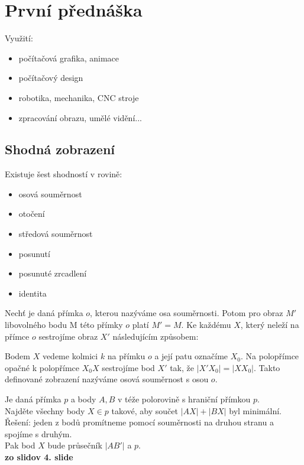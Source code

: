 \documentclass[../main.tex]{subfiles}
\begin{document}
\section{První přednáška}

Využití:
\begin{itemize}
    \item počítačová grafika, animace
    \item počítačový design
    \item robotika, mechanika, CNC stroje
    \item zpracování obrazu, umělé vidění...
\end{itemize}

\subsection{Shodná zobrazení}

Existuje šest shodností v rovině:
\begin{itemize}
    \item osová souměrnost
    \item otočení
    \item středová souměrnost
    \item posunutí
    \item posunuté zrcadlení
    \item identita
\end{itemize}

\begin{definition}
    Nechť je daná přímka $o$, kterou nazýváme osa souměrnosti. Potom pro 
    obraz $M'$ libovolného bodu M této přímky $o$ platí $M' = M$. Ke každému
    $X$, který neleží na přímce $o$ sestrojíme obraz $X'$ následujícím způsobem:

    \vspace{3mm}
    \noindent
    Bodem $X$ vedeme kolmici $k$ na přímku $o$ a její patu označíme $X_0$. Na 
    polopřímce opačné k polopřímce	 $X_0 X$ sestrojíme bod $X'$ tak, že $|X'X_0|=|XX_0|$.
    Takto definované zobrazení nazýváme osová souměrnost s osou $o$.
\end{definition}

\begin{example}
    Je daná přímka $p$ a body $A,B$ v téže polorovině s hraniční přímkou $p$.\\
    Najděte všechny body $X\in p$ takové, aby součet $|AX|+|BX|$ byl minimální.\\
    Řešení: jeden z bodů promítneme pomocí souměrnosti na druhou stranu a spojíme s druhým.\\
    Pak bod $X$ bude průsečník $|AB'|$ a $p$.
    \\\textbf{zo slidov 4. slide}
\end{example}
\end{document}
